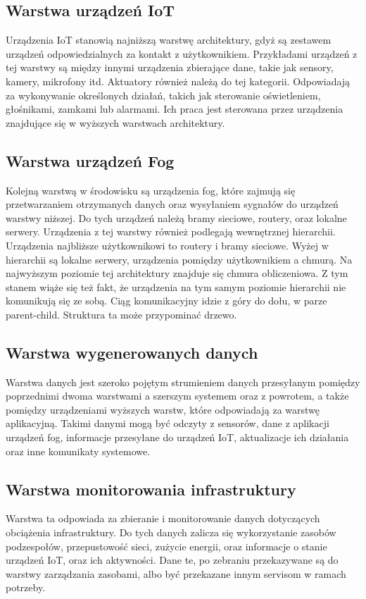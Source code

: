 \documentclass[
    oneside,            %
    left=2.5cm,         %
    right=2.5cm,        %
    top=2.5cm,          %
    bottom=3cm,         %
    bindingoffset=6mm,  %
    nohyphenation=false %
]{eiti/eiti-report}
\begin{document}
\subsection{Warstwa urządzeń IoT}
Urządzenia IoT stanowią najniższą warstwę architektury, gdyż są zestawem urządzeń odpowiedzialnych za kontakt z użytkownikiem. Przykładami urządzeń z tej warstwy są między innymi urządzenia zbierające dane, takie jak sensory, kamery, mikrofony itd. Aktuatory również należą do tej kategorii. Odpowiadają za wykonywanie określonych działań, takich jak sterowanie oświetleniem, głośnikami, zamkami lub alarmami. Ich praca jest sterowana przez urządzenia znajdujące się w wyższych warstwach architektury.

\subsection{Warstwa urządzeń Fog}
Kolejną warstwą w środowisku są urządzenia fog, które zajmują się przetwarzaniem otrzymanych danych oraz wysyłaniem sygnałów do urządzeń warstwy niższej. Do tych urządzeń należą bramy sieciowe, routery, oraz lokalne serwery. Urządzenia z tej warstwy również podlegają wewnętrznej hierarchii. Urządzenia najbliższe użytkownikowi to routery i bramy sieciowe. Wyżej w hierarchii są lokalne serwery, urządzenia pomiędzy użytkownikiem a chmurą. Na najwyższym poziomie tej architektury znajduje się chmura obliczeniowa.
Z tym stanem wiąże się też fakt, że urządzenia na tym samym poziomie hierarchii nie komunikują się ze sobą. Ciąg komunikacyjny idzie z góry do dołu, w parze parent-child. Struktura ta może przypominać drzewo.

\subsection{Warstwa wygenerowanych danych}
Warstwa danych jest szeroko pojętym strumieniem danych przesyłanym pomiędzy poprzednimi dwoma warstwami a szerszym systemem oraz z powrotem, a także pomiędzy urządzeniami wyższych warstw, które odpowiadają za warstwę aplikacyjną. Takimi danymi mogą być odczyty z sensorów, dane z aplikacji urządzeń fog, informacje przesyłane do urządzeń IoT, aktualizacje ich działania oraz inne komunikaty systemowe.

\subsection{Warstwa monitorowania infrastruktury}
Warstwa ta odpowiada za zbieranie i monitorowanie danych dotyczących obciążenia infrastruktury. Do tych danych zalicza się wykorzystanie zasobów podzespołów, przepustowość sieci, zużycie energii, oraz informacje o stanie urządzeń IoT, oraz ich aktywności. Dane te, po zebraniu przekazywane są do warstwy zarządzania zasobami, albo być przekazane innym servisom w ramach potrzeby.
\end{document}
